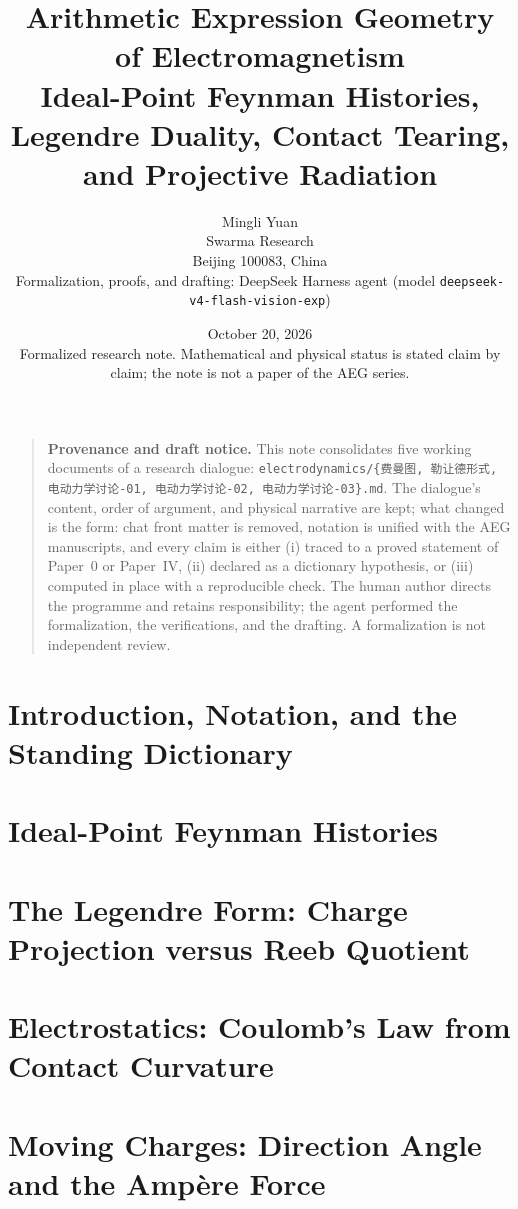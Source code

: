 \documentclass[11pt]{article}
\title{\textbf{Arithmetic Expression Geometry of Electromagnetism}\\[0.35em]
\large Ideal-Point Feynman Histories, Legendre Duality, Contact Tearing,
and Projective Radiation}
\author{
Mingli Yuan\\
\small Swarma Research\\
\small Beijing 100083, China\\[0.8em]
\small Formalization, proofs, and drafting: DeepSeek Harness agent
(model \texttt{deepseek-v4-flash-vision-exp})
}
\date{October 20, 2026\\[0.25em]
\small Formalized research note.  Mathematical and physical status is stated
claim by claim; the note is not a paper of the AEG series.}
\theoremstyle{definition}
\theoremstyle{remark}
\newcommand{\AEG}{AEG}
\begin{document}
\maketitle

\begin{quote}\small
\textbf{Provenance and draft notice.}
This note consolidates five working documents of a research dialogue:
\texttt{electrodynamics/\{费曼图, 勒让德形式, 电动力学讨论-01,
电动力学讨论-02, 电动力学讨论-03\}.md}.  The dialogue's content, order of
argument, and physical narrative are kept; what changed is the form: chat
front matter is removed, notation is unified with the \AEG{} manuscripts, and
every claim is either (i) traced to a proved statement of Paper~0 or Paper~IV,
(ii) declared as a dictionary hypothesis, or (iii) computed in place with a
reproducible check.  The human author directs the programme and retains
responsibility; the agent performed the formalization, the verifications, and
the drafting.  A formalization is not independent review.
\end{quote}



\setcounter{tocdepth}{2}
\tableofcontents
\newpage

\section{Introduction, Notation, and the Standing Dictionary}
\label{sec:intro}


\section{Ideal-Point Feynman Histories}
\label{sec:feynman}


\section{The Legendre Form: Charge Projection versus Reeb Quotient}
\label{sec:legendre}


\section{Electrostatics: Coulomb's Law from Contact Curvature}
\label{sec:coulomb}


\section{Moving Charges: Direction Angle and the Amp\`ere Force}
\label{sec:ampere}

\end{document}
